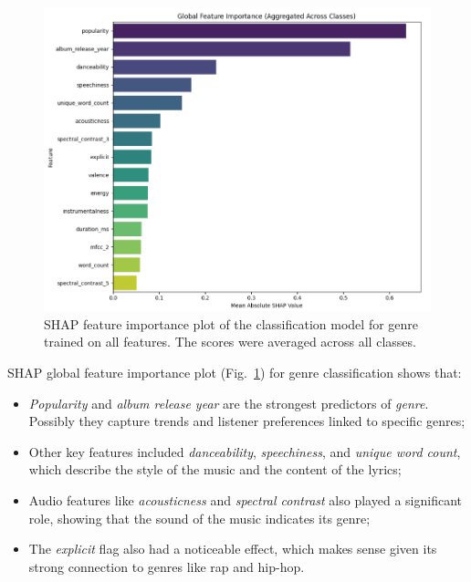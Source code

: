 \begin{center}
\begin{figure}[H]
  \centering
  \includegraphics[width=6in]{img/feature_importance_genre_clf.png}
  \caption{SHAP feature importance plot of the classification model for genre
  trained on all features. The scores were averaged across all classes.}
  \label{Figure:feature_importance_genre_clf}
\end{figure}
\end{center}

SHAP global feature importance
plot (Fig.~\ref{Figure:feature_importance_genre_clf}) for genre classification
shows that:
\begin{itemize}
  \item \textit{Popularity} and \textit{album release year} are the strongest
    predictors of \textit{genre}.  Possibly they capture trends and listener
    preferences linked to specific genres;
  \item Other key features included \textit{danceability},
    \textit{speechiness}, and \textit{unique word count}, which describe the
    style of the music and the content of the lyrics;
  \item Audio features like \textit{acousticness} and
    \textit{spectral contrast} also played a significant role, showing
    that the sound of the music indicates its genre;
  \item The \textit{explicit} flag also had a noticeable effect, which makes
    sense given its strong connection to genres like rap and hip-hop.

\end{itemize}

